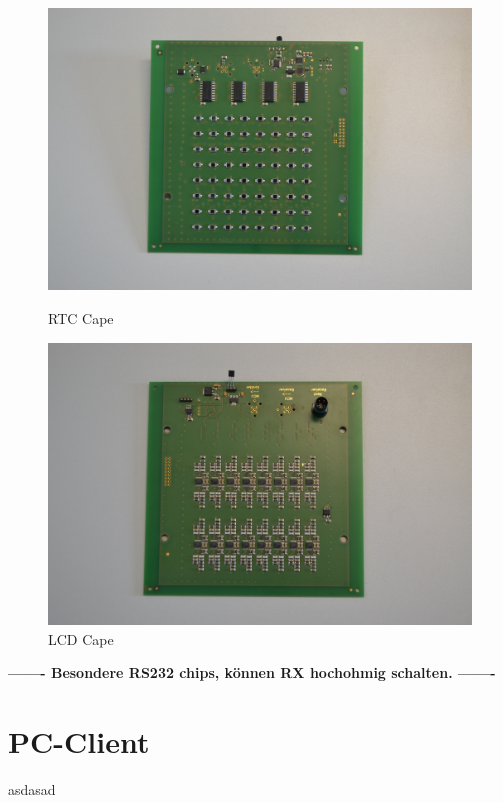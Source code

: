  \begin{figure}[!htb]
  \includegraphics[width=\linewidth]{img/general/DegraBoardTop.jpg}
  \caption{RTC Cape}\label{figure_CapeRTC}
\endminipage\hfill
{}%
  \includegraphics[width=\linewidth]{img/general/DegraBoardBottom.jpg}
  \caption{LCD Cape}\label{figure_CapeLCD}
\endminipage
\end{figure}


\textbf{------- Besondere RS232 chips, können RX hochohmig schalten. -------}



\newpage



\newpage
\section{PC-Client}
\label{section_Verwaltung}
asdasad

\newpage



\newpage


